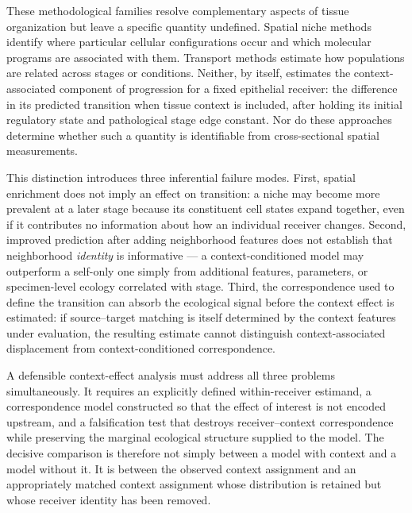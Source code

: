 These methodological families resolve complementary aspects of tissue
organization but leave a specific quantity undefined. Spatial niche methods
identify where particular cellular configurations occur and which molecular
programs are associated with them. Transport methods estimate how populations
are related across stages or conditions. Neither, by itself, estimates the
context-associated component of progression for a fixed epithelial receiver:
the difference in its predicted transition when tissue context is included,
after holding its initial regulatory state and pathological stage edge
constant. Nor do these approaches determine whether such a quantity is
identifiable from cross-sectional spatial measurements.

This distinction introduces three inferential failure modes. First, spatial
enrichment does not imply an effect on transition: a niche may become more
prevalent at a later stage because its constituent cell states expand
together, even if it contributes no information about how an individual
receiver changes. Second, improved prediction after adding neighborhood
features does not establish that neighborhood \emph{identity} is informative
--- a context-conditioned model may outperform a self-only one simply from
additional features, parameters, or specimen-level ecology correlated with
stage. Third, the correspondence used to define the transition can absorb the
ecological signal before the context effect is estimated: if source--target
matching is itself determined by the context features under evaluation, the
resulting estimate cannot distinguish context-associated displacement from
context-conditioned correspondence.

A defensible context-effect analysis must address all three problems
simultaneously. It requires an explicitly defined within-receiver estimand, a
correspondence model constructed so that the effect of interest is not
encoded upstream, and a falsification test that destroys receiver--context
correspondence while preserving the marginal ecological structure supplied to
the model. The decisive comparison is therefore not simply between a model
with context and a model without it. It is between the observed context
assignment and an appropriately matched context assignment whose distribution
is retained but whose receiver identity has been removed.


